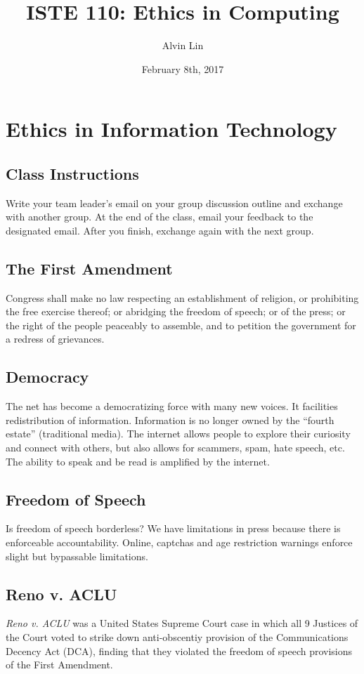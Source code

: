 \documentclass[letterpaper, 12pt]{article}
\title{ISTE 110: Ethics in Computing}
\author{Alvin Lin}
\date{February 8th, 2017}
\begin{document}
\maketitle

\section*{Ethics in Information Technology}

\subsection*{Class Instructions}
Write your team leader's email on your group discussion outline and exchange
with another group. At the end of the class, email your feedback to the
designated email. After you finish, exchange again with the next group.

\subsection*{The First Amendment}
Congress shall make no law respecting an establishment of religion, or
prohibiting the free exercise thereof; or abridging the freedom of speech; or
of the press; or the right of the people peaceably to assemble, and to petition
the government for a redress of grievances.

\subsection*{Democracy}
The net has become a democratizing force with many new voices. It facilities
redistribution of information. Information is no longer owned by the ``fourth
estate'' (traditional media). The internet allows people to explore their
curiosity and connect with others, but also allows for scammers, spam, hate
speech, etc. The ability to speak and be read is amplified by the internet.

\subsection*{Freedom of Speech}
Is freedom of speech borderless? We have limitations in press because there is
enforceable accountability. Online, captchas and age restriction warnings
enforce slight but bypassable limitations.

\subsection*{Reno v. ACLU}
\textit{Reno v. ACLU} was a United States Supreme Court case in which all 9
Justices of the Court voted to strike down anti-obscentiy provision of the
Communications Decency Act (DCA), finding that they violated the freedom of
speech provisions of the First Amendment.
\end{document}
